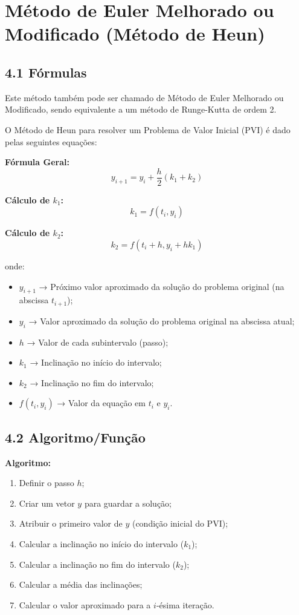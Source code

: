 \chapter{Método de Euler Melhorado ou Modificado (Método de Heun)}

\section*{4.1 Fórmulas}

Este método também pode ser chamado de Método de Euler Melhorado ou Modificado, sendo equivalente a um método de Runge-Kutta de ordem 2.

O Método de Heun para resolver um Problema de Valor Inicial (PVI) é dado pelas seguintes equações:

\textbf{Fórmula Geral:}
\begin{equation}
y_{i+1} = y_i + \frac{h}{2}(k_1 + k_2)
\end{equation}

\textbf{Cálculo de $k_1$:}
\begin{equation}
k_1 = f(t_i, y_i)
\end{equation}

\textbf{Cálculo de $k_2$:}
\begin{equation}
k_2 = f(t_i + h, y_i + h k_1)
\end{equation}

onde:
\begin{itemize}
    \item $y_{i+1}$ → Próximo valor aproximado da solução do problema original (na abscissa $t_{i+1}$);
    \item $y_i$ → Valor aproximado da solução do problema original na abscissa atual;
    \item $h$ → Valor de cada subintervalo (passo);
    \item $k_1$ → Inclinação no início do intervalo;
    \item $k_2$ → Inclinação no fim do intervalo;
    \item $f(t_i , y_i)$ → Valor da equação em $t_i$ e $y_i$.
\end{itemize}

\section*{4.2 Algoritmo/Função}

\textbf{Algoritmo:}
\begin{enumerate}
    \item Definir o passo $h$;
    \item Criar um vetor $y$ para guardar a solução;
    \item Atribuir o primeiro valor de $y$ (condição inicial do PVI);
    \item Calcular a inclinação no início do intervalo ($k_1$);
    \item Calcular a inclinação no fim do intervalo ($k_2$);
    \item Calcular a média das inclinações;
    \item Calcular o valor aproximado para a $i$-ésima iteração.
\end{enumerate}
